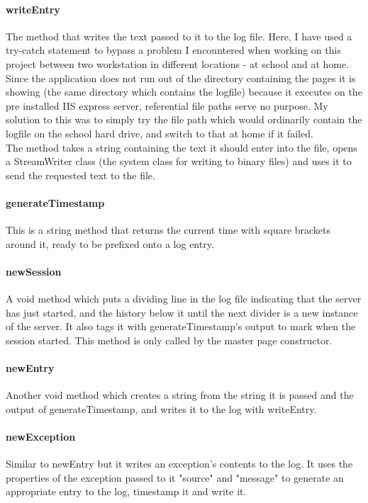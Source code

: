 ﻿\documentclass{article}
\begin{document}
    \paragraph{writeEntry} The method that writes the text passed to it to the log file.
    Here, I have used a try-catch statement to bypass a problem I encountered when working on this project between two workstation in different locations - at school and at home.
    Since the application does not run out of the directory containing the pages it is showing (the same directory which contains the logfile) because it executes on the pre installed IIS express server, referential file paths serve no purpose.
    My solution to this was to simply try the file path which would ordinarily contain the logfile on the school hard drive, and switch to that at home if it failed.
    \\
    The method takes a string containing the text it should enter into the file, opens a StreamWriter class (the system class for writing to binary files) and uses it to send the requested text to the file.
    \paragraph{generateTimestamp} This is a string method that returns the current time with square brackets around it, ready to be prefixed onto a log entry.
    \paragraph{newSession} A void method which puts a dividing line in the log file indicating that the server has just started, and the history below it until the next divider is a new instance of the server.
    It also tags it with generateTimestamp's output to mark when the session started.
    This method is only called by the master page constructor.
    \paragraph{newEntry} Another void method which creates a string from the string it is passed and the output of generateTimestamp, and writes it to the log with writeEntry.
    \paragraph{newException} Similar to newEntry but it writes an exception's contents to the log.
    It uses the properties of the exception passed to it "source" and "message" to generate an appropriate entry to the log, timestamp it and write it.
    \newpage
\end{document}
